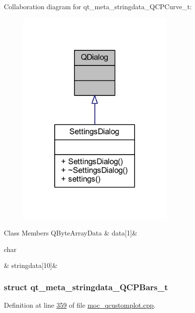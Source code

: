 Collaboration diagram for qt\+\_\+meta\+\_\+stringdata\+\_\+\+Q\+C\+P\+Curve\+\_\+t\+:
\nopagebreak
\begin{figure}[H]
\begin{center}
\leavevmode
\includegraphics[width=222pt]{d8/d0a/a00292}
\end{center}
\end{figure}
\begin{DoxyFields}{Class Members}
\hypertarget{a00067_ac2243b1095d588f9864242ffc67f432f}{Q\+Byte\+Array\+Data}\label{a00067_ac2243b1095d588f9864242ffc67f432f}
&
data\mbox{[}1\mbox{]}&
\\
\hline

\hypertarget{a00067_ad141d5092cc25ae43c6c60a782ca04ee}{char}\label{a00067_ad141d5092cc25ae43c6c60a782ca04ee}
&
stringdata\mbox{[}10\mbox{]}&
\\
\hline

\end{DoxyFields}
\label{dc/d57/a00194}
\hypertarget{a00067_dc/d57/a00194}{}
\subsubsection{struct qt\+\_\+meta\+\_\+stringdata\+\_\+\+Q\+C\+P\+Bars\+\_\+t}


Definition at line \hyperlink{a00067_source_l00359}{359} of file \hyperlink{a00067_source}{moc\+\_\+qcustomplot.\+cpp}.



